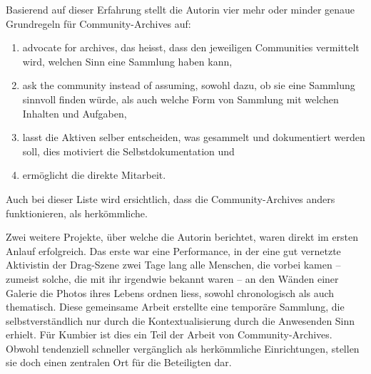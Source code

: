 \documentclass[a4paper,
fontsize=11pt,
oneside,
numbers=noperiodatend,
parskip=half-,
bibliography=totoc,
final
]{scrartcl}
\begin{document}
Basierend auf dieser Erfahrung stellt die Autorin vier mehr oder minder
genaue Grundregeln für Community-Archives auf:

\begin{enumerate}
\def\labelenumi{\arabic{enumi}.}
\item
  advocate for archives, das heisst, dass den jeweiligen Communities
  vermittelt wird, welchen Sinn eine Sammlung haben kann,
\item
  ask the community instead of assuming, sowohl dazu, ob sie eine
  Sammlung sinnvoll finden würde, als auch welche Form von Sammlung mit
  welchen Inhalten und Aufgaben,
\item
  lasst die Aktiven selber entscheiden, was gesammelt und dokumentiert
  werden soll, dies motiviert die Selbstdokumentation und
\item
  ermöglicht die direkte Mitarbeit.
\end{enumerate}

Auch bei dieser Liste wird ersichtlich, dass die Community-Archives
anders funktionieren, als herkömmliche.

Zwei weitere Projekte, über welche die Autorin berichtet, waren direkt
im ersten Anlauf erfolgreich. Das erste war eine Performance, in der
eine gut vernetzte Aktivistin der Drag-Szene zwei Tage lang alle
Menschen, die vorbei kamen -- zumeist solche, die mit ihr irgendwie
bekannt waren -- an den Wänden einer Galerie die Photos ihres Lebens
ordnen liess, sowohl chronologisch als auch thematisch. Diese gemeinsame
Arbeit erstellte eine temporäre Sammlung, die selbstverständlich nur
durch die Kontextualisierung durch die Anwesenden Sinn erhielt. Für
Kumbier ist dies ein Teil der Arbeit von Community-Archives. Obwohl
tendenziell schneller vergänglich als herkömmliche Einrichtungen,
stellen sie doch einen zentralen Ort für die Beteiligten dar.
\end{document}
